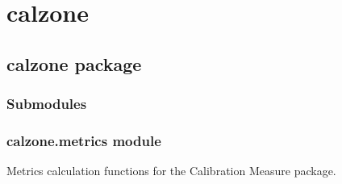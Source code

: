 \documentclass[letterpaper,10pt,english]{sphinxmanual}
\begin{document}
\sphinxstepscope


\chapter{calzone}
\label{\detokenize{modules:calzone}}\label{\detokenize{modules::doc}}
\sphinxstepscope


\section{calzone package}
\label{\detokenize{calzone:calzone-package}}\label{\detokenize{calzone::doc}}

\subsection{Submodules}
\label{\detokenize{calzone:submodules}}

\subsection{calzone.metrics module}
\label{\detokenize{calzone:module-calzone.metrics}}\label{\detokenize{calzone:calzone-metrics-module}}
\sphinxAtStartPar
Metrics calculation functions for the Calibration Measure package.
\end{document}
